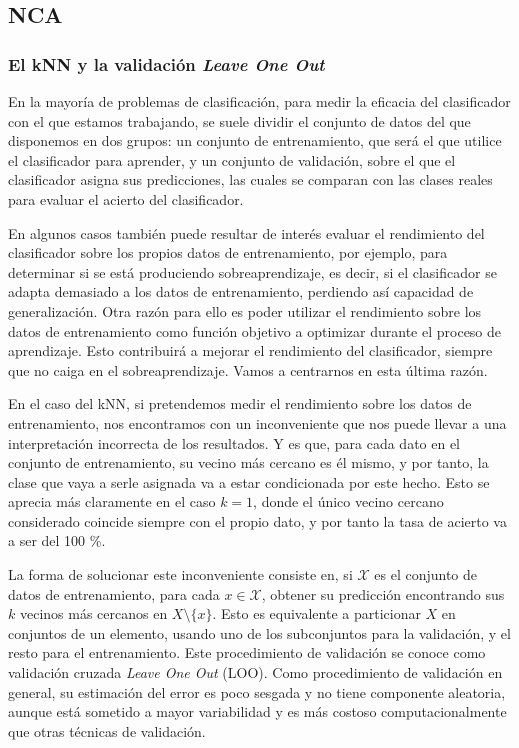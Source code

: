 \subsection{NCA}

\subsubsection{El kNN y la validación \emph{Leave One Out}}

En la mayoría de problemas de clasificación, para medir la eficacia del clasificador con el que estamos trabajando, se suele dividir el conjunto de datos del que disponemos en dos grupos: un conjunto de entrenamiento, que será el que utilice el clasificador para aprender, y un conjunto de validación, sobre el que el clasificador asigna sus predicciones, las cuales se comparan con las clases reales para evaluar el acierto del clasificador.

En algunos casos también puede resultar de interés evaluar el rendimiento del clasificador sobre los propios datos de entrenamiento, por ejemplo, para determinar si se está produciendo sobreaprendizaje, es decir, si el clasificador se adapta demasiado a los datos de entrenamiento, perdiendo así capacidad de generalización. Otra razón para ello es poder utilizar el rendimiento sobre los datos de entrenamiento como función objetivo a optimizar durante el proceso de aprendizaje. Esto contribuirá a mejorar el rendimiento del clasificador, siempre que no caiga en el sobreaprendizaje. Vamos a centrarnos en esta última razón.

En el caso del kNN, si pretendemos medir el rendimiento sobre los datos de entrenamiento, nos encontramos con un inconveniente que nos puede llevar a una interpretación incorrecta de los resultados. Y es que, para cada dato en el conjunto de entrenamiento, su vecino más cercano es él mismo, y por tanto, la clase que vaya a serle asignada va a estar condicionada por este hecho. Esto se aprecia más claramente en el caso $k=1$, donde el único vecino cercano considerado coincide siempre con el propio dato, y por tanto la tasa de acierto va a ser del 100 \%.

La forma de solucionar este inconveniente consiste en, si $\mathcal{X}$ es el conjunto de datos de entrenamiento, para cada $x \in \mathcal{X}$, obtener su predicción encontrando sus $k$ vecinos más cercanos en $X  \setminus \{x\}$. Esto es equivalente a particionar $X$ en conjuntos de un elemento, usando uno de los subconjuntos para la validación, y el resto para el entrenamiento. Este procedimiento de validación se conoce como validación cruzada \emph{Leave One Out} (LOO). Como procedimiento de validación en general, su estimación del error es poco sesgada y no tiene componente aleatoria, aunque está sometido a mayor variabilidad y es más costoso computacionalmente que otras técnicas de validación.

